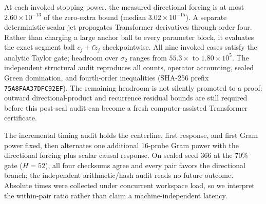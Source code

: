 \documentclass{article}
\begin{document}
At each invoked stopping power, the measured directional forcing is at most
$2.60\times10^{-13}$ of the zero-extra bound (median
$3.02\times10^{-15}$).  A separate deterministic scalar jet propagates
Transformer derivatives through order four.  Rather than charging a large
anchor ball to every parameter block, it evaluates the exact segment ball
$c_j+t\widetilde z_j$ checkpointwise.  All nine invoked cases satisfy the
analytic Taylor gate; headroom over $\sigma_2$ ranges from $55.3\times$ to
$1.80\times10^5$.  The independent structural audit reproduces all counts,
operator accounting, sealed Green domination, and fourth-order inequalities
(SHA-256 prefix \texttt{75A8FAA37DFC92EF}).  The remaining headroom is not
silently promoted to a proof: outward directional-product and recurrence
residual bounds are still required before this post-seal audit can become a
fresh computer-assisted Transformer certificate.

The incremental timing audit holds the centerline, first response, and first
Gram power fixed, then alternates one additional 16-probe Gram power with the
directional forcing plus scalar causal response.  On sealed seed 366 at the
70\% gate ($H=52$), all four checksums agree and every pair favors the
directional branch; the independent arithmetic/hash audit reads no future
outcome.  Absolute times were collected under concurrent workspace load, so we
interpret the within-pair ratio rather than claim a machine-independent latency.
\end{document}

